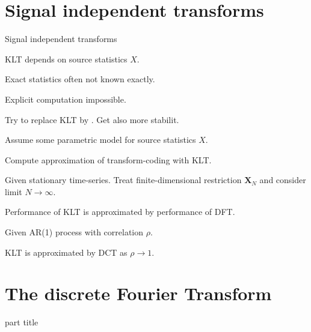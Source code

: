  \section{Signal independent transforms}
\begin{frame}{Signal independent transforms}
\bit
\item KLT depends on source statistics $X$. 
\item Exact statistics often not known exactly. 
\item Explicit computation impossible. 
\item [\iarrow] Try to replace KLT by . Get also more stabilit.
\eit
{}
\bit 
\item Assume some parametric model for source statistics $X$.
\item Compute approximation of transform-coding with KLT. 
\eit
{}
\bit
\item  Given stationary time-series. Treat finite-dimensional restriction $\mathbf{X}_N$ and consider limit $N\to\infty$.
\item[\iarrow] Performance of KLT is approximated by performance of DFT.  
\eit
{}
\bit
\item Given AR(1) process with correlation $\rho$.
\item KLT is approximated by DCT as $\rho\to 1$.
\eit
\end{frame}

\section{The discrete Fourier Transform}
\begin{frame}
 \vspace{12.0ex}
\begin{center}
\begin{beamercolorbox}[sep=12pt,center]{part title}
\insertsection\par
\end{beamercolorbox}
\end{center}
\end{frame}


